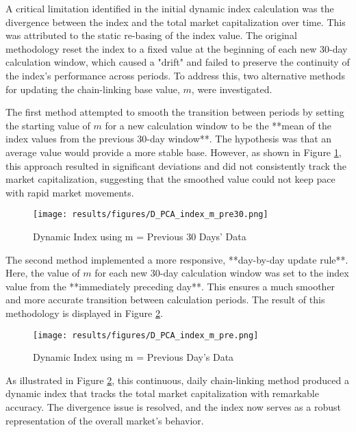 \documentclass[12pt]{article}
\begin{document}
A critical limitation identified in the initial dynamic index calculation was the divergence between the index and the total market capitalization over time. This was attributed to the static re-basing of the index value. The original methodology reset the index to a fixed value at the beginning of each new 30-day calculation window, which caused a "drift" and failed to preserve the continuity of the index's performance across periods. To address this, two alternative methods for updating the chain-linking base value, $m$, were investigated.

The first method attempted to smooth the transition between periods by setting the starting value of $m$ for a new calculation window to be the **mean of the index values from the previous 30-day window**. The hypothesis was that an average value would provide a more stable base. However, as shown in Figure \ref{fig:m_mean_30}, this approach resulted in significant deviations and did not consistently track the market capitalization, suggesting that the smoothed value could not keep pace with rapid market movements.

\begin{figure}[H]
    \centering
    \texttt{[image: results/figures/D\_PCA\_index\_m\_pre30.png]} %
    \caption{Dynamic Index using m = Previous 30 Days' Data}
    \label{fig:m_mean_30}
\end{figure}

The second method implemented a more responsive, **day-by-day update rule**. Here, the value of $m$ for each new 30-day calculation window was set to the index value from the **immediately preceding day**. This ensures a much smoother and more accurate transition between calculation periods. The result of this methodology is displayed in Figure \ref{fig:m_prev_day}.

\begin{figure}[H]
    \centering
    \texttt{[image: results/figures/D\_PCA\_index\_m\_pre.png]} %
    \caption{Dynamic Index using m = Previous Day's Data}
    \label{fig:m_prev_day}
\end{figure}

As illustrated in Figure \ref{fig:m_prev_day}, this continuous, daily chain-linking method produced a dynamic index that tracks the total market capitalization with remarkable accuracy. The divergence issue is resolved, and the index now serves as a robust representation of the overall market's behavior.
\end{document}

